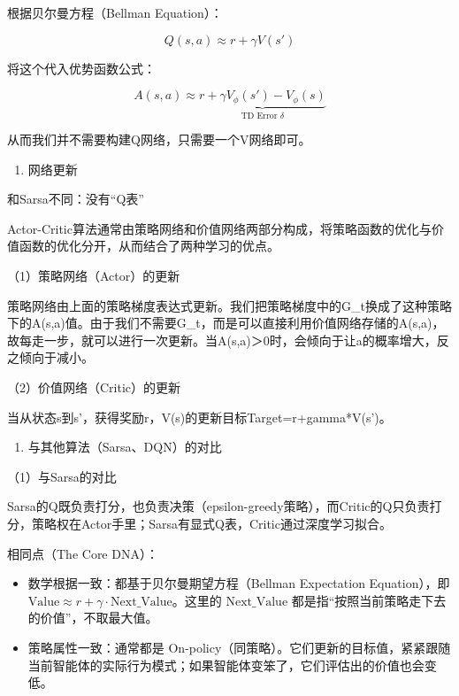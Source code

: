 根据贝尔曼方程（Bellman Equation）：

\[
Q(s,a)\approx r+\gamma V(s')
\]

将这个代入优势函数公式：

\[
A(s,a)\approx \underbrace{r+\gamma V_\phi(s')-V_\phi(s)}_{\text{TD Error }\delta}
\]

从而我们并不需要构建Q网络，只需要一个V网络即可。

\begin{enumerate}
\def\labelenumi{\arabic{enumi}.}
\setcounter{enumi}{2}
\tightlist
\item
  网络更新
\end{enumerate}

和Sarsa不同：没有``Q表''

Actor-Critic算法通常由策略网络和价值网络两部分构成，将策略函数的优化与价值函数的优化分开，从而结合了两种学习的优点。

（1）策略网络（Actor）的更新

策略网络由上面的策略梯度表达式更新。我们把策略梯度中的G\_t换成了这种策略下的A(s,a)值。由于我们不需要G\_t，而是可以直接利用价值网络存储的A(s,a)，故每走一步，就可以进行一次更新。当A(s,a)＞0时，会倾向于让a的概率增大，反之倾向于减小。

（2）价值网络（Critic）的更新

当从状态s到s'，获得奖励r，V(s)的更新目标Target=r+gamma*V(s')。

\begin{enumerate}
\def\labelenumi{\arabic{enumi}.}
\setcounter{enumi}{3}
\tightlist
\item
  与其他算法（Sarsa、DQN）的对比
\end{enumerate}

（1）与Sarsa的对比

Sarsa的Q既负责打分，也负责决策（epsilon-greedy策略），而Critic的Q只负责打分，策略权在Actor手里；Sarsa有显式Q表，Critic通过深度学习拟合。

相同点（The Core DNA）：

\begin{itemize}
\tightlist
\item
  数学根据一致：都基于贝尔曼期望方程（Bellman Expectation Equation），即 \(\mathrm{Value}\approx r+\gamma\cdot\mathrm{Next\_Value}\)。这里的 \(\mathrm{Next\_Value}\) 都是指``按照当前策略走下去的价值''，不取最大值。
\item
  策略属性一致：通常都是 On-policy（同策略）。它们更新的目标值，紧紧跟随当前智能体的实际行为模式；如果智能体变笨了，它们评估出的价值也会变低。
\end{itemize}

